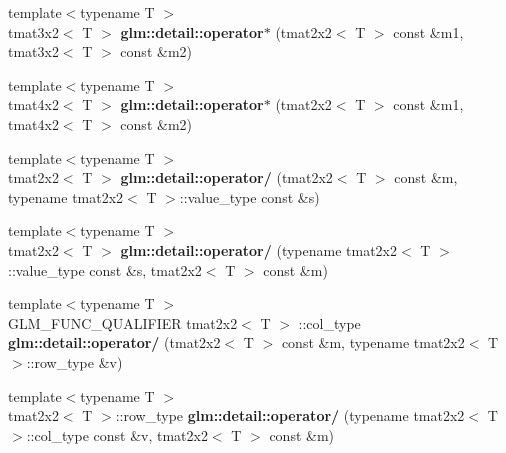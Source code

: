 \begin{DoxyCompactItemize}
\item 
\hypertarget{namespaceglm_1_1detail_aacff163b07c31f3bc10d1716e9e369d1}{{\footnotesize template$<$typename T $>$ }\\tmat3x2$<$ \-T $>$ {\bfseries glm\-::detail\-::operator$\ast$} (tmat2x2$<$ \-T $>$ const \&m1, tmat3x2$<$ \-T $>$ const \&m2)}\label{namespaceglm_1_1detail_aacff163b07c31f3bc10d1716e9e369d1}

\item 
\hypertarget{namespaceglm_1_1detail_ab95abc8ac4d2269704b95599739569cd}{{\footnotesize template$<$typename T $>$ }\\tmat4x2$<$ \-T $>$ {\bfseries glm\-::detail\-::operator$\ast$} (tmat2x2$<$ \-T $>$ const \&m1, tmat4x2$<$ \-T $>$ const \&m2)}\label{namespaceglm_1_1detail_ab95abc8ac4d2269704b95599739569cd}

\item 
\hypertarget{namespaceglm_1_1detail_af74bf4dcd3a3362834ab9c7b99553215}{{\footnotesize template$<$typename T $>$ }\\tmat2x2$<$ \-T $>$ {\bfseries glm\-::detail\-::operator/} (tmat2x2$<$ \-T $>$ const \&m, typename tmat2x2$<$ \-T $>$\-::value\-\_\-type const \&s)}\label{namespaceglm_1_1detail_af74bf4dcd3a3362834ab9c7b99553215}

\item 
\hypertarget{namespaceglm_1_1detail_a09ec59edcd0517e5a9dfb9718c49971b}{{\footnotesize template$<$typename T $>$ }\\tmat2x2$<$ \-T $>$ {\bfseries glm\-::detail\-::operator/} (typename tmat2x2$<$ \-T $>$\-::value\-\_\-type const \&s, tmat2x2$<$ \-T $>$ const \&m)}\label{namespaceglm_1_1detail_a09ec59edcd0517e5a9dfb9718c49971b}

\item 
\hypertarget{namespaceglm_1_1detail_a9536cd5c5d11934a15c37f40e6ffe443}{{\footnotesize template$<$typename T $>$ }\\\-G\-L\-M\-\_\-\-F\-U\-N\-C\-\_\-\-Q\-U\-A\-L\-I\-F\-I\-E\-R tmat2x2$<$ \-T $>$\*
\-::col\-\_\-type {\bfseries glm\-::detail\-::operator/} (tmat2x2$<$ \-T $>$ const \&m, typename tmat2x2$<$ \-T $>$\-::row\-\_\-type \&v)}\label{namespaceglm_1_1detail_a9536cd5c5d11934a15c37f40e6ffe443}

\item 
\hypertarget{namespaceglm_1_1detail_a669b7dbc65b62ebb8ab8c593d61904b8}{{\footnotesize template$<$typename T $>$ }\\tmat2x2$<$ \-T $>$\-::row\-\_\-type {\bfseries glm\-::detail\-::operator/} (typename tmat2x2$<$ \-T $>$\-::col\-\_\-type const \&v, tmat2x2$<$ \-T $>$ const \&m)}\label{namespaceglm_1_1detail_a669b7dbc65b62ebb8ab8c593d61904b8}


\end{DoxyCompactItemize}
